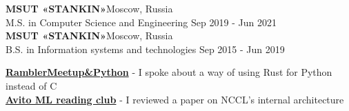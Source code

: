 \documentclass[a4paper]{article}
\begin{document}
\textbf{MSUT «STANKIN»}\hfill Moscow, Russia\\
M.S. in Computer Science and Engineering \hfill Sep 2019 - Jun 2021\\
\vspace{2mm}
\textbf{MSUT «STANKIN»}\hfill Moscow, Russia\\
B.S. in Information systems and technologies \hfill Sep 2015 - Jun 2019\\
\vspace{2mm}

% 



{\textbf{\href{https://www.youtube.com/watch?v=gpf_KOAmgzY&t=3040s}{RamblerMeetup\&Python}}} - I spoke about a way of using Rust for Python instead of C\\
{\textbf{\href{https://www.youtube.com/watch?v=m7wPkcx5P_A}{Avito ML reading club}}} - I reviewed a paper on NCCL's internal architecture\\
\vspace*{2mm}
\end{document}
